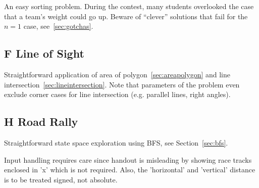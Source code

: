 An easy sorting problem.
During the contest, many students overlooked the case that a team's weight could go up.
Beware of ``clever'' solutions that fail for the $n=1$ case, see~\ref{sec:gotchas}.

\subsection{F Line of Sight}
\label{sec:2011-f-lineofsight}

Straightforward application of area of polygon~\ref{sec:areapolygon} and line intersection~\ref{sec:lineintersection}.
Note that parameters of the problem even exclude corner cases for line intersection (e.g. parallel lines, right angles).

\subsection{H Road Rally}
\label{sec:2011-h-rally}

Straightforward state space exploration using BFS, see Section~\ref{sec:bfs}.

Input handling requires care since handout is misleading by showing race tracks enclosed in 'x' which is not
required.  Also, the 'horizontal' and 'vertical' distance is to be treated signed, not absolute.

